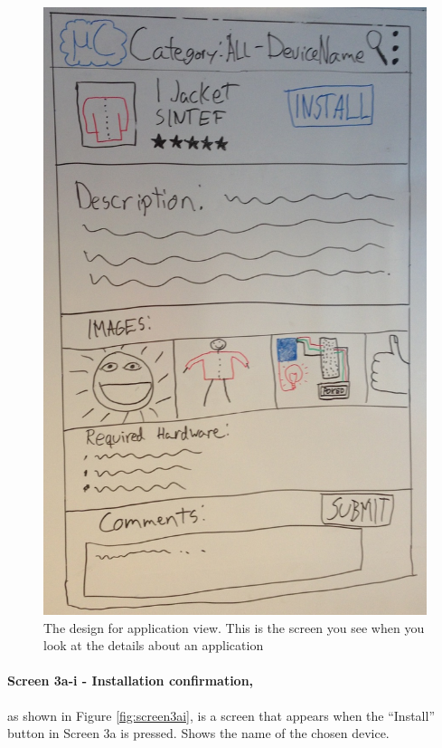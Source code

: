 \begin{figure}[H]
\centering
\includegraphics[scale=0.2]{images/Design_guide/Screen3a.png}
\caption[Screen 3a - Application view]{The design for application view. This is the screen you see when you look at the details about an application}
\label{fig:screen3a}
\end{figure}


\paragraph{Screen 3a-i - Installation confirmation,} as shown in Figure \ref{fig:screen3ai}, is a 
screen that appears when the ``Install'' button in Screen 3a is pressed. Shows the name of the chosen device.

